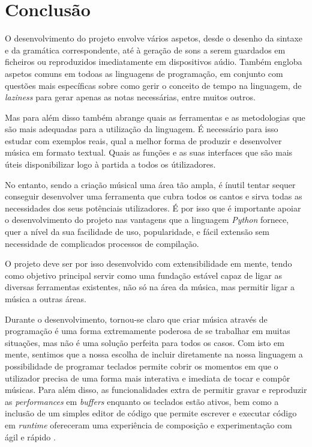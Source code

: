 \chapter{Conclusão}
O desenvolvimento do projeto envolve vários aspetos, desde o desenho da sintaxe e da gramática correspondente, até à geração de sons a serem guardados em ficheiros ou reproduzidos imediatamente em dispositivos aúdio. Também engloba aspetos comuns em todoas as linguagens de programação, em conjunto com questões mais específicas sobre como gerir o conceito de tempo na linguagem, de \textit{laziness} para gerar apenas as notas necessárias, entre muitos outros.

Mas para além disso também abrange quais as ferramentas e as metodologias que são mais adequadas para a utilização da linguagem. É necessário para isso estudar com exemplos reais, qual a melhor forma de produzir e desenvolver música em formato textual. Quais as funções e as suas interfaces que são mais úteis disponibilizar logo à partida a todos os útilizadores.

No entanto, sendo a criação músical uma área tão ampla, é ínutil tentar sequer conseguir desenvolver uma ferramenta que cubra todos os cantos e sirva todas as necessidades dos seus potênciais utilizadores. É por isso que é importante apoiar o desenvolvimento do projeto nas vantagens que a linguagem \textit{Python} fornece, quer a nível da sua facilidade de uso, popularidade, e fácil extensão sem necessidade de complicados processos de compilação.

O projeto deve ser por isso desenvolvido com extensibilidade em mente, tendo como objetivo principal servir como uma fundação estável capaz de ligar as diversas ferramentas existentes, não só na área da música, mas permitir ligar a música a outras áreas.

Durante o desenvolvimento, tornou-se claro que criar música através de programação é uma forma extremamente poderosa de se trabalhar em muitas situações, mas não é uma solução perfeita para todos os casos. Com isto em mente, sentimos que a nossa escolha de incluir diretamente na nossa linguagem a possibilidade de programar teclados permite cobrir os momentos em que o utilizador precisa de uma forma mais interativa e imediata de tocar e compôr músicas. Para além disso, as funcionalidades extra de permitir gravar e reproduzir as \textit{performances} em \textit{buffers} enquanto os teclados estão ativos, bem como a inclusão de um simples editor de código que permite escrever e executar código em \textit{runtime} ofereceram uma experiência de composição e experimentação com ágil e rápido .

